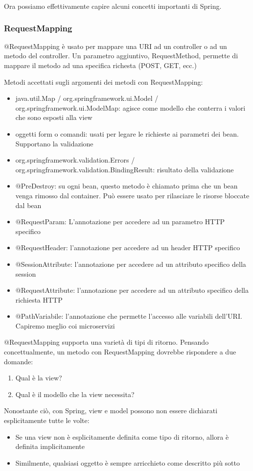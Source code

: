 \documentclass[11pt,a4paper]{book}
\begin{document}
Ora possiamo effettivamente capire alcuni concetti importanti di Spring.
\subsubsection{RequestMapping}
$@$RequestMapping è usato per mappare una URI ad un controller o ad un metodo del controller. Un parametro aggiuntivo, RequestMethod, permette di mappare il metodo ad una specifica richesta (POST, GET, ecc.)

Metodi accettati sugli argomenti dei metodi con RequestMapping:
\begin{itemize}
	\item java.util.Map / org.springframework.ui.Model / org.springframework.ui.ModelMap: agisce come modello che conterra i valori che sono esposti alla view
	\item oggetti form o comandi: usati per legare le richieste ai parametri dei bean. Supportano la validazione
	\item org.springframework.validation.Errors / org.springframework.validation.BindingResult: risultato della validazione
	\item $@$PreDestroy: su ogni bean, questo metodo è chiamato prima che un bean venga rimosso dal container. Può essere usato per rilasciare le risorse bloccate dal bean
	\item $@$RequestParam: L'annotazione per accedere ad un parametro HTTP specifico
	\item $@$RequestHeader: l'annotazione per accedere ad un header HTTP specifico
	\item $@$SessionAttribute: l'annotazione per accedere ad un attributo specifico della session
	\item $@$RequestAttribute: l'annotazione per accedere ad un attributo specifico della richiesta HTTP
	\item $@$PathVariabile: l'annotazione che permette l'accesso alle variabili dell'URI. Capiremo meglio coi microservizi
\end{itemize}

$@$RequestMapping supporta una varietà di tipi di ritorno. Pensando concettualmente, un metodo con RequestMapping dovrebbe rispondere a due domande:
\begin{enumerate}
	\item Qual è la view?
	\item Qual è il modello che la view necessita?
\end{enumerate}

Nonostante ciò, con Spring, view e model possono non essere dichiarati esplicitamente tutte le volte:
\begin{itemize}
	\item Se una view non è esplicitamente definita come tipo di ritorno, allora è definita implicitamente
	\item Similmente, qualsiasi oggetto è sempre arricchieto come descritto più sotto
\end{itemize}
\end{document}
